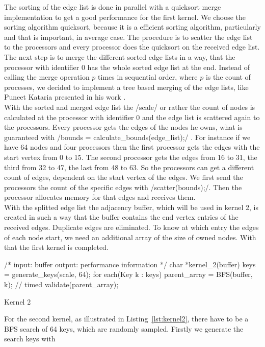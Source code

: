 \documentclass[12pt,a4paper]{article}
\begin{document}
The sorting of the edge list is done in parallel with a quicksort merge implementation to get a good performance for the first kernel. We choose the sorting algorithm quicksort, because it is a efficient sorting algorithm, particularly and that is important, in average case. The procedure is to scatter the edge list to the processors and every processor does the quicksort on the received edge list. The next step is to merge the different sorted edge lists in a way, that the processor with identifier 0 has the whole sorted edge list at the end. Instead of calling the merge operation \(p\) times in sequential order, where \(p\) is the count of processes, we decided to implement a tree based merging of the edge lists, like Puneet Kataria presented in his work \cite{quickmerge}.\\
With the sorted and merged edge list the \cinline/scale/ or rather the count of nodes is calculated at the processor with identifier 0 and the edge list is scattered again to the processors. Every processor gets the edges of the nodes he owns, what is guaranteed with \cinline/bounds = calculate_bounds(edge_list);/ . For instance if we have 64 nodes and four processors then the first processor gets the edges with the start vertex from 0 to 15. The second processor gets the edges from 16 to 31, the third from 32 to 47, the last from 48 to 63. So the processors can get a different count of edges, dependent on the start vertex of the edges. We first send the processors the count of the specific edges with \cinline/scatter(bounds);/. Then the processor allocates memory for that edges and receives them. \\
With the splitted edge list the adjacency buffer, which will be used in kernel 2, is created in such a way that the buffer contains the end vertex entries of the received edges. Duplicate edges are eliminated. To know at which entry the edges of each node start, we need an additional array of the size of owned nodes. With that the first kernel is completed. \\
\begin{listing}[H]
\begin{ccode}
/*
input: buffer 
output: performance information
*/
char *kernel_2(buffer){
	keys = generate_keys(scale, 64);
	for each(Key k : keys){
		parent_array = BFS(buffer, k); // timed
		validate(parent_array);
	}
}
\end{ccode}
\caption{Kernel 2}
\label{lst:kernel2}
\end{listing}
For the second kernel, as illustrated in Listing~\ref{lst:kernel2}, there have to be a BFS search of 64 keys, which are randomly sampled. Firstly we generate the search keys with 
\end{document}
